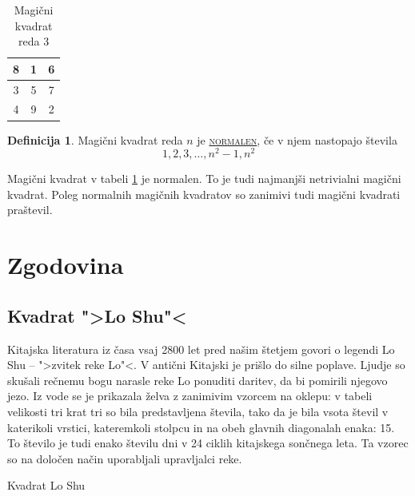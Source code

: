 \documentclass[a4paper,12pt]{article}
\newcommand{\pojem}[1]{\underline{\textsc{#1}}}
\theoremstyle{definition}
\newtheorem{definicija}{Definicija}
\theoremstyle{plain}
\theoremstyle{plain}
\begin{document}
\begin{table}[!ht]
   \centering
   \caption{Magični kvadrat reda 3}
   \label{MKreda3}
   \large
   \begin{tabular}{|c|c|c|}
      \hline
      8 & 1 & 6 \\\hline
      3 & 5 & 7 \\\hline
      4 & 9 & 2 \\\hline
   \end{tabular}
   \normalsize
\end{table}

\begin{definicija}
   Magični kvadrat reda $ n $ je \pojem{normalen}, če v njem nastopajo števila
   \begin{equation}
      1,2,3,\dots,n^2 - 1,n^2
   \end{equation}
\end{definicija}

Magični kvadrat v tabeli \ref{MKreda3} je normalen.
To je tudi najmanjši netrivialni magični kvadrat.
Poleg normalnih magičnih kvadratov so zanimivi tudi magični kvadrati praštevil.


\section{Zgodovina}

\subsection{Kvadrat ">Lo Shu"<}

Kitajska literatura iz časa vsaj 2800 let pred našim štetjem govori o legendi
Lo Shu -- ">zvitek reke Lo"<. V antični Kitajski je prišlo do
silne poplave. Ljudje so skušali rečnemu bogu narasle reke Lo ponuditi daritev,
da bi pomirili njegovo jezo. Iz vode se je prikazala želva z zanimivim vzorcem
na oklepu: v tabeli velikosti tri krat tri so bila predstavljena števila, tako
da je bila vsota števil v katerikoli vrstici, kateremkoli stolpcu in na obeh
glavnih diagonalah enaka: 15. To število je tudi enako številu dni v 24 ciklih
kitajskega sončnega leta. Ta vzorec so na določen način uporabljali upravljalci
reke.

Kvadrat Lo Shu
\end{document}
